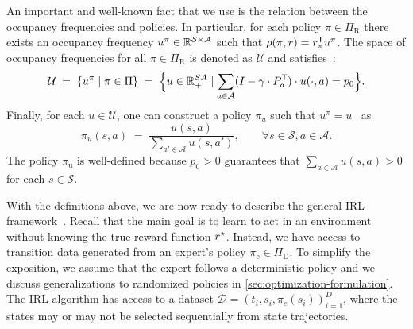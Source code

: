 \documentclass[10pt]{article}
\renewcommand{\cite}{\citep}
\theoremstyle{plain}
\theoremstyle{remark}
\begin{document}
An important and well-known fact that we use is the relation between the occupancy frequencies and policies. In particular, for each policy $\pi\in\Pi_{\mathrm{R}}$ there exists an occupancy frequency $u^{\pi}\in \mathbb{R}^{\mathcal{S}\times \mathcal{A}}$ such that $\rho(\pi, r) = r_{\pi}^{\mathsf{T}} u^{\pi}$. The space of occupancy frequencies for all $\pi\in \Pi_{\mathrm{R}}$
is denoted as $\mathcal{U}$ and satisfies~\cite[Section~6.9]{Puterman1994}:
\begin{equation} \label{eq:definition-u}
  \mathcal{U}
  \; =\; 
\left\{ u^{\pi} \mid  \pi \in \Pi \right\}
\; =\;
\Bigl\{ u\in \mathbb{R}^{SA}_{+} \mid \sum_{a\in \mathcal{A}} (I - \gamma\cdot P^{\mathsf{T}}_a) \cdot u(\cdot, a) = p_0 \Bigr\}.
\end{equation}
Finally, for each $u\in \mathcal{U}$, one can construct a policy $\pi_u$ such that $u^{\pi} = u$~\cite[Theorem~6.9.1]{Puterman1994} as
\begin{equation}\label{eq:policy-construction}
\pi_u(s, a) \; =\;  \frac{u(s,a)}{\sum_{a' \in \mathcal{A}} u(s,a')}, \qquad \forall s\in \mathcal{S}, a\in \mathcal{A}.
\end{equation}
The policy $\pi_{\mathrm{u}}$ is well-defined because $p_0 > 0$ guarantees that $\sum_{a\in \mathcal{A}} u(s,a) > 0$ for each $s\in \mathcal{S}$. 


With the definitions above, we are now ready to describe the general IRL framework~\cite{abbeel2004,Syed2008,Ho2016}. Recall that the main goal is to learn to act in an environment without knowing the true reward function $r^{\mathnormal{\star}}$. Instead, we have access to transition data generated from an expert's policy $\pi_{\mathrm{e}} \in \Pi_{\mathrm{D}}$. To simplify the exposition, we assume that the expert follows a deterministic policy and we discuss generalizations to randomized policies in \cref{sec:optimization-formulation}. The IRL algorithm has access to a dataset  \( \mathcal{D} = {(t_i, s_i, \pi_e(s_i))}_{i=1}^D \), where the states may or may not be selected sequentially from state trajectories.
\end{document}

